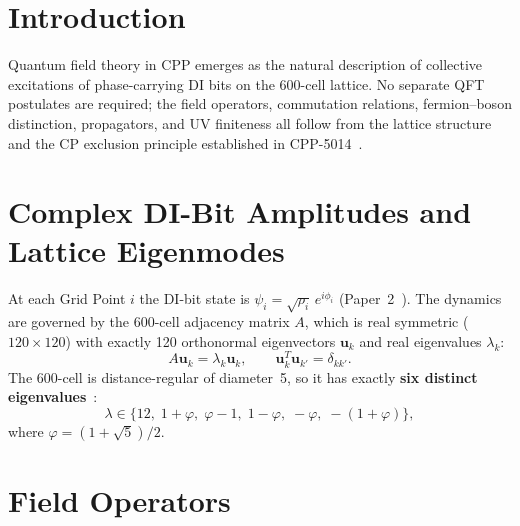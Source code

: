 \documentclass[11pt,letterpaper]{article}
\begin{document}
\bigskip
\raggedright
\tableofcontents
\newpage


\tableofcontents
\newpage

\section{Introduction}

Quantum field theory in CPP emerges as the natural description of
collective excitations of phase-carrying DI bits on the 600-cell
lattice.  No separate QFT postulates are required; the field operators,
commutation relations, fermion--boson distinction, propagators, and
UV finiteness all follow from the lattice structure and the CP exclusion
principle established in CPP-5014~\cite{cpp5014}.

\section{Complex DI-Bit Amplitudes and Lattice Eigenmodes}

At each Grid Point $i$ the DI-bit state is $\psi_i =
\sqrt{\rho_i}\,e^{i\phi_i}$ (Paper~2~\cite{cpp2040a}).  The dynamics
are governed by the 600-cell adjacency matrix $A$, which is real
symmetric ($120\times120$) with exactly 120 orthonormal eigenvectors
$\mathbf{u}_k$ and real eigenvalues $\lambda_k$:
\begin{equation}
A\mathbf{u}_k = \lambda_k\mathbf{u}_k, \qquad
\mathbf{u}_k^T\mathbf{u}_{k'} = \delta_{kk'}.
\label{eq:eigenmodes}
\end{equation}
The 600-cell is distance-regular of diameter~5, so it has exactly
\textbf{six distinct eigenvalues}~\cite{brouwer1989}:
\begin{equation}
\lambda \in \{12,\;1+\varphi,\;\varphi-1,\;1-\varphi,\;-\varphi,\;
-(1+\varphi)\},
\label{eq:eigenvalues}
\end{equation}
where $\varphi = (1+\sqrt5)/2$.

\section{Field Operators}
\end{document}

